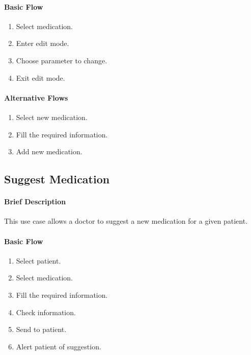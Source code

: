 \documentclass{report}
\begin{document}
\begin{multicols}{2}
    \paragraph{Basic Flow}
    \begin{enumerate}
        \item Select medication.
        \item Enter edit mode.
        \item Choose parameter to change.
        \item Exit edit mode.
    \end{enumerate}
    \columnbreak

    \paragraph{Alternative Flows}
    \begin{enumerate}[label=A\arabic*.]
        \item Select new medication.
        \item Fill the required information.
        \item Add new medication.
    \end{enumerate}
\end{multicols}

\vspace{1em}
\subsection{Suggest Medication}
\paragraph{Brief Description}
This use case allows a doctor to suggest a new medication for a given patient.

\paragraph{Basic Flow}
\begin{enumerate}
    \item Select patient.
    \item Select medication.
    \item Fill the required information.
    \item Check information.
    \item Send to patient.
    \item Alert patient of suggestion.
\end{enumerate}
\end{document}
